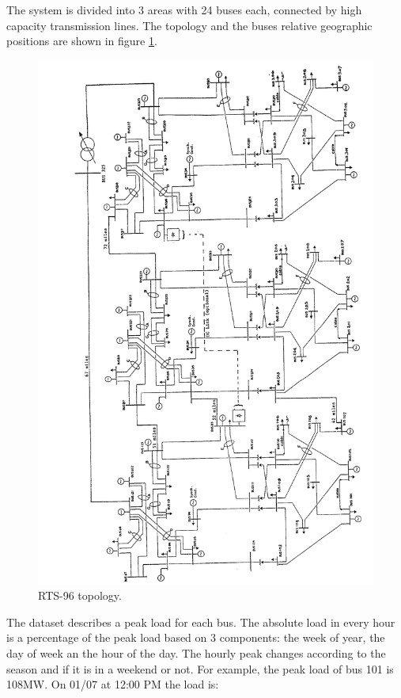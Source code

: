 \documentclass[12pt,LUDisStyle,twosided]{book}
\begin{document}
The system is divided into 3 areas with 24 buses each, connected by high capacity transmission lines. The topology and the buses relative geographic positions are shown in figure \ref{fig:ieeetopology}.

\begin{figure}[H]
  \includegraphics[width=\textwidth,height=\textheight,keepaspectratio]{ieeetopology.png}
  \caption{RTS-96 topology. \cite{wongieee}}
  \label{fig:ieeetopology}
\end{figure}

The dataset describes a peak load for each bus. The absolute load in every hour is a percentage of the peak load based on 3 components: the week of year, the day of week an the hour of the day. The hourly peak changes according to the season and if it is in a weekend or not. For example, the peak load of bus 101 is 108MW. On 01/07 at 12:00 PM the load is:
\end{document}
